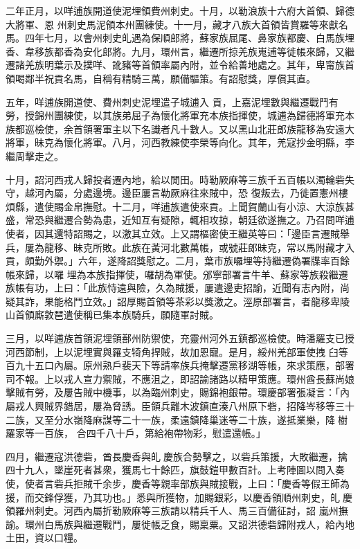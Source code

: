\begin{pinyinscope}
 二年正月，以咩逋族開道使泥埋領費州刺史。十月，以勒浪族十六府大首領、歸德大將軍、恩
 州刺史馬泥領本州團練使。十一月，藏才八族大首領皆賞羅等來獻名馬。四年七月，以會州刺史癿遇為保順郎將，蘇家族屈尾、鼻家族都慶、白馬族埋香、韋移族都香為安化郎將。九月，環州言，繼遷所掠羌族嵬逋等徙帳來歸，又繼遷諸羌族明葉示及撲咩、訛豬等首領率屬內附，並令給善地處之。其年，卑甯族首領喝鄰半祝貢名馬，自稱有精騎三萬，願備驅策。有詔慰獎，厚償其直。



 五年，咩逋族開道使、費州刺史泥埋遣子城逋入
 貢，上嘉泥埋數與繼遷戰鬥有勞，授錦州團練使，以其族弟屈子為懷化將軍充本族指揮使，城逋為歸德將軍充本族都巡檢使，余首領署軍主以下名識者凡十數人。又以黑山北莊郎族龍移為安遠大將軍，昧克為懷化將軍。八月，河西教練使李榮等向化。其年，羌寇抄金明縣，李繼周擊走之。



 十月，詔河西戎人歸投者遷內地，給以閒田。時勒厥麻等三族千五百帳以濁輪砦失守，越河內屬，分處邊境。邊臣屢言勒厥麻往來賊中，恐
 復叛去，乃徙置憲州樓煩縣，遣使賜金帛撫慰。十二月，咩逋族遣使來貢。上聞賀蘭山有小涼、大涼族甚盛，常恐與繼遷合勢為患，近知互有疑隙，輒相攻掠，朝廷欲遂撫之。乃召問咩逋使者，因其還特詔賜之，以激其立效。上又謂樞密使王繼英等曰：「邊臣言遷賊舉兵，屢為龍移、昧克所敗。此族在黃河北數萬帳，或號莊郎昧克，常以馬附藏才入貢，頗勤外禦。」六年，遂降詔獎慰之。二月，葉市族囉埋等持繼遷偽署牒率百餘帳來歸，以囉
 埋為本族指揮使，囉胡為軍使。邠寧部署言牛羊、蘇家等族殺繼遷族帳有功，上曰：「此族恃遠與險，久為賊援，屢遣邊吏招諭，近聞有志內附，尚疑其詐，果能格鬥立效。」詔厚賜首領等茶彩以獎激之。涇原部署言，者龍移卑陵山首領廝敦琶遣使稱已集本族騎兵，願隨軍討賊。



 三月，以咩逋族首領泥埋領鄯州防禦使，充靈州河外五鎮都巡檢使。時潘羅支已授河西節制，上以泥埋實與羅支犄角捍賊，故加恩寵。是月，綏州羌部軍使拽
 臼等百九十五口內屬。原州熟戶裴天下等請率族兵掩擊遷黨移湖等帳，來求策應，部署司不報。上以戎人宣力禦賊，不應沮之，即詔諭諸路以精甲策應。環州酋長蘇尚娘擊賊有勞，及屢告賊中機事，以為臨州刺史，賜錦袍銀帶。環慶部署張凝言：「內屬戎人興賊界錯居，屢為脅誘。臣領兵離木波鎮直湊八州原下砦，招降岑移等三十二族，又至分水嶺降麻謀等二十一族，柔遠鎮降巢迷等二十族，遂抵業樂，降𡗀樹羅家等一百族，
 合四千八十戶，第給袍帶物彩，慰遣還帳。」



 四月，繼遷寇洪德砦，酋長慶香與癿𡗀慶族合勢擊之，以砦兵策援，大敗繼遷，擒四十九人，墜崖死者甚衆，獲馬七十餘匹，旗鼓鎧甲數百計。上考陣圖以問入奏使，使者言砦兵拒賊千余步，慶香等親率部族與賊接戰，上曰：「慶香等假王師為援，而交鋒俘獲，乃其功也。」悉與所獲物，加賜銀彩，以慶香領順州刺史，癿𡗀慶領羅州刺史。河西內屬折勒厥麻等三族請以精兵千人、馬三百備征討，詔
 嵐州撫諭。環州白馬族與繼遷戰鬥，屢徙帳乏食，賜稟粟。又詔洪德砦歸附戎人，給內地土田，資以口糧。




\end{pinyinscope}

